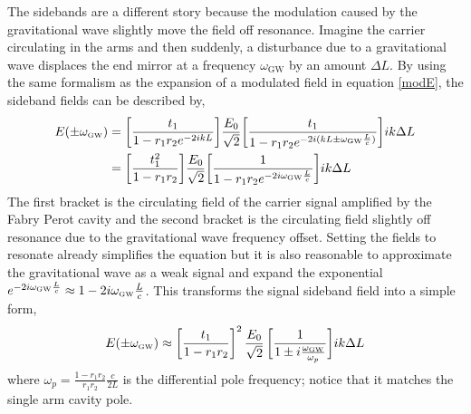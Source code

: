 		The sidebands are a different story because the modulation caused by the gravitational wave slightly move the field off resonance.  Imagine the carrier circulating in the arms and then suddenly, a disturbance due to a gravitational wave displaces the end mirror at a frequency $\omega_\text{GW}$ by an amount $\Delta L$.   By using the same formalism as the expansion of a modulated field in equation \ref{modE}, the sideband fields can be described by,
		\begin{equation}
		\begin{aligned}\label{Egw}
			E(\pm \omega_{\text{\tiny GW}}) &= \bigg[ \frac{t_1}{1-r_1 r_2 e^{-2ikL}}\bigg] \frac{E_0}{\sqrt{2}} \bigg[\frac{t_1}{1-r_1 r_2 e^{-2i (kL \pm \omega_{\text{\tiny GW}}  \frac{L}{c})}} \bigg] ik\Delta L\\
			& =  \bigg[ \frac{t_1^2}{1-r_1 r_2}\bigg]  \frac{E_0}{\sqrt{2}} \bigg[\frac{ 1}{1-r_1 r_2 e^{-2i  \omega_{\text{\tiny GW}}  \frac{L}{c}}} \bigg] ik\Delta L
		\end{aligned}
		\end{equation}
		The first bracket is the circulating field of the carrier signal amplified by the Fabry Perot cavity and the second bracket is the circulating field slightly off resonance due to the gravitational wave frequency offset.  Setting the fields to resonate already simplifies the equation but it is also reasonable to approximate the gravitational wave as a weak signal and expand the exponential $e^{- 2i \omega_{\text{\tiny GW}}  \frac{L}{c}} \approx 1 - 2i \omega_{\text{\tiny GW}}  \frac{L}{c}$.  This transforms the signal sideband field into a simple form,
		\begin{equation}
		E(\pm \omega_{\text{\tiny GW}}) \approx \bigg[\frac{t_1}{1-r_1r_2}\bigg]^2 \, \frac{E_0}{\sqrt{2}} \, \bigg[\frac{1}{1 \pm i \frac{\omega_{\text{\tiny GW}}}{\omega_p}}\bigg] ik\Delta L
		\end{equation}
		where $\omega_p = \frac{1-r_1r_2}{r_1r_2}\frac{c}{2L}$ is the differential pole frequency; notice that it matches the single arm cavity pole.
		
